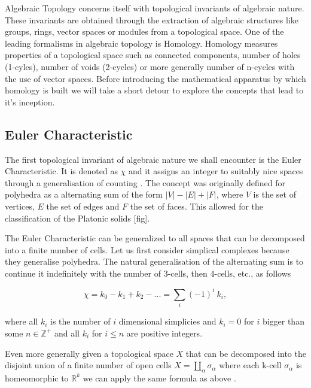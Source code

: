 
Algebraic Topology concerns itself with topological invariants of algebraic nature. These invariants are obtained through the extraction of algebraic structures like groups, rings, vector spaces or modules from a topological space. One of the leading formalisms in algebraic topology is Homology. Homology measures properties of a topological space such as connected components, number of holes (1-cyles), number of voids (2-cycles) or more generally number of n-cycles with the use of vector spaces. Before introducing the mathematical apparatus by which homology is built we will take a short detour to explore the concepts that lead to it's inception.


\subsection{Euler Characteristic}

The first topological invariant of algebraic nature we shall encounter is the Euler Characteristic. It is denoted as $\chi$ and it assigns an integer to suitably nice spaces through a generalisation of counting \cite{elementary-applied-topology}. The concept was originally defined for polyhedra as a alternating sum of the form $|V| - |E| + |F|$, where $V$ is the set of vertices, $E$ the set of edges and $F$ the set of faces. This allowed for the classification of the Platonic solids [fig].


The Euler Characteristic can be generalized to all spaces that can be decomposed into a finite number of cells. Let us first consider simplical complexes because they generalise polyhedra. The natural generalisation of the alternating sum is to continue it indefinitely with the number of 3-cells, then 4-cells, etc., as follows

$$ \chi = k_0 - k_1 + k_2 - ... = \sum_{i}{(-1)^i~k_i}, $$

where all $k_i$ is the number of $i$ dimensional simplicies and $k_i = 0$ for $i$ bigger than some $n \in \mathbb{Z}^+$ and all $k_i$ for $i \le n$ are positive integers. 


Even more generally given a topological space $X$ that can be decomposed into the disjoint union of a finite number of open cells $X = \coprod_{\alpha}\sigma_{\alpha}$ where each k-cell $\sigma_{\alpha}$ is homeomorphic to $\mathbb{R}^k$ we can apply the same formula as above \cite{elementary-applied-topology}. 

